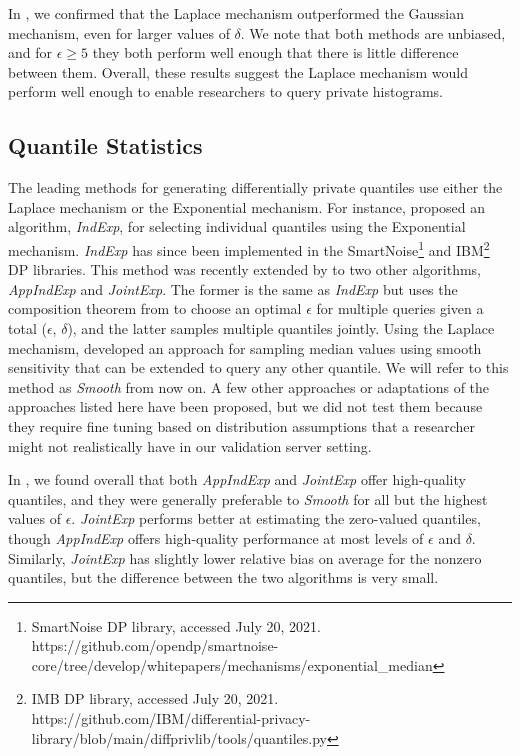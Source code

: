 In \citet{barrientos2021}, we confirmed that the Laplace mechanism outperformed the Gaussian mechanism, even for larger values of $\delta$. We note that both methods are unbiased, and for $\epsilon \geq 5$ they both perform well enough that there is little difference between them. Overall, these results suggest the Laplace mechanism would perform well enough to enable researchers to query private histograms.

\subsection{Quantile Statistics}
The leading methods for generating differentially private quantiles use either the Laplace mechanism or the Exponential mechanism. For instance, \citet{smith2011privacy} proposed an algorithm, \textit{IndExp}, for selecting individual quantiles using the Exponential mechanism. \textit{IndExp} has since been implemented in the SmartNoise\footnote{SmartNoise DP library, accessed July 20, 2021. https://github.com/opendp/smartnoise-core/tree/develop/whitepapers/mechanisms/exponential\_median} and IBM\footnote{IMB DP library, accessed July 20, 2021. https://github.com/IBM/differential-privacy-library/blob/main/diffprivlib/tools/quantiles.py} DP libraries. This method was recently extended by \citet{gillenwater2021differentially} to two other algorithms, \textit{AppIndExp} and \textit{JointExp}. The former is the same as \textit{IndExp} but uses the composition theorem from \citet{dong2020optimal} to choose an optimal $\epsilon$ for multiple queries given a total ($\epsilon$, $\delta$), and the latter samples multiple quantiles jointly. Using the Laplace mechanism, \citet{nissim2007smooth} developed an approach for sampling median values using smooth sensitivity that can be extended to query any other quantile. We will refer to this method as \textit{Smooth} from now on. A few other approaches or adaptations of the approaches listed here have been proposed, but we did not test them because they require fine tuning based on distribution assumptions that a researcher might not realistically have in our validation server setting.

In \citet{barrientos2021}, we found overall that both \textit{AppIndExp} and \textit{JointExp} offer high-quality quantiles, and they were generally preferable to \textit{Smooth} for all but the highest values of $\epsilon$. \textit{JointExp} performs better at estimating the zero-valued quantiles, though \textit{AppIndExp} offers high-quality performance at most levels of $\epsilon$ and $\delta$. Similarly, \textit{JointExp} has slightly lower relative bias on average for the nonzero quantiles, but the difference between the two algorithms is very small. 

